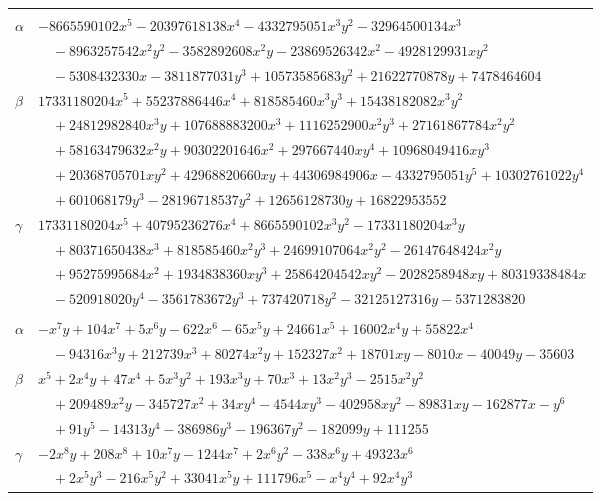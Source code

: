\documentclass[11pt]{article}
\begin{document}
\begin{longtable}{@{}ll@{}}
\addlinespace[3pt]
\multicolumn{2}{@{}l}{$\{i,j\}=\{79,80\}$, $k_{ij}=2^{3}\cdot 3^{4}\cdot 5\cdot 7^{4}\cdot 31$}\\
$\alpha$ & $-8665590102x^{5}-20397618138x^{4}-4332795051x^{3}y^{2}-32964500134x^{3}$\\
 & $\quad -8963257542x^{2}y^{2}-3582892608x^{2}y-23869526342x^{2}-4928129931xy^{2}$\\
 & $\quad -5308432330x-3811877031y^{3}+10573585683y^{2}+21622770878y+7478464604$\\
$\beta$ & $17331180204x^{5}+55237886446x^{4}+818585460x^{3}y^{3}+15438182082x^{3}y^{2}$\\
 & $\quad +24812982840x^{3}y+107688883200x^{3}+1116252900x^{2}y^{3}+27161867784x^{2}y^{2}$\\
 & $\quad +58163479632x^{2}y+90302201646x^{2}+297667440xy^{4}+10968049416xy^{3}$\\
 & $\quad +20368705701xy^{2}+42968820660xy+44306984906x-4332795051y^{5}+10302761022y^{4}$\\
 & $\quad +601068179y^{3}-28196718537y^{2}+12656128730y+16822953552$\\
$\gamma$ & $17331180204x^{5}+40795236276x^{4}+8665590102x^{3}y^{2}-17331180204x^{3}y$\\
 & $\quad +80371650438x^{3}+818585460x^{2}y^{3}+24699107064x^{2}y^{2}-26147648424x^{2}y$\\
 & $\quad +95275995684x^{2}+1934838360xy^{3}+25864204542xy^{2}-2028258948xy+80319338484x$\\
 & $\quad -520918020y^{4}-3561783672y^{3}+737420718y^{2}-32125127316y-5371283820$\\
\addlinespace[3pt]
\multicolumn{2}{@{}l}{$\{i,j\}=\{80,108\}$, $k_{ij}=2\cdot 3^{2}\cdot 13\cdot 19$}\\
$\alpha$ & $-x^{7}y+104x^{7}+5x^{6}y-622x^{6}-65x^{5}y+24661x^{5}+16002x^{4}y+55822x^{4}$\\
 & $\quad -94316x^{3}y+212739x^{3}+80274x^{2}y+152327x^{2}+18701xy-8010x-40049y-35603$\\
$\beta$ & $x^{5}+2x^{4}y+47x^{4}+5x^{3}y^{2}+193x^{3}y+70x^{3}+13x^{2}y^{3}-2515x^{2}y^{2}$\\
 & $\quad +209489x^{2}y-345727x^{2}+34xy^{4}-4544xy^{3}-402958xy^{2}-89831xy-162877x-y^{6}$\\
 & $\quad +91y^{5}-14313y^{4}-386986y^{3}-196367y^{2}-182099y+111255$\\
$\gamma$ & $-2x^{8}y+208x^{8}+10x^{7}y-1244x^{7}+2x^{6}y^{2}-338x^{6}y+49323x^{6}$\\
 & $\quad +2x^{5}y^{3}-216x^{5}y^{2}+33041x^{5}y+111796x^{5}-x^{4}y^{4}+92x^{4}y^{3}$\\

\end{longtable}
\end{document}
